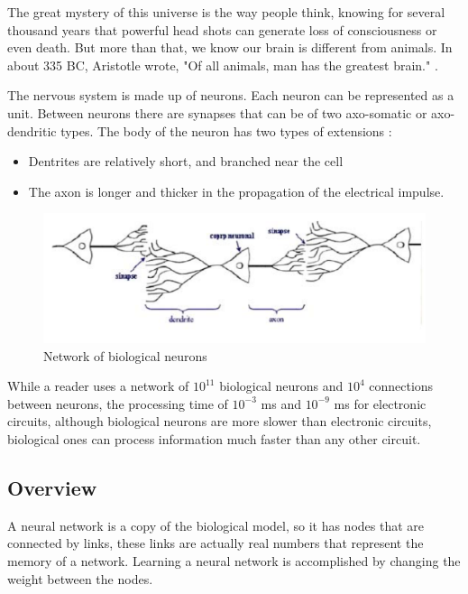 The great mystery of this universe is the way people think, knowing for several 
thousand years that powerful head shots can generate loss of consciousness or even death.
But more than that, we know our brain is different from animals. 
In about 335 BC, Aristotle wrote, "Of all animals, man has the greatest brain." \cite{book.neuronal.network.1995}.

The nervous system is made up of neurons. Each neuron can be represented as a unit.
Between neurons there are synapses that can be of two axo-somatic or axo-dendritic types. 
The body of the neuron has two types of extensions \cite{book.anatomie.1985}:
\begin{itemize}
\item Dentrites are relatively short, and branched near the cell
\item The axon is longer and thicker in the propagation of the electrical impulse.
\end{itemize}

\begin{figure}[htbp]
	\centerline{\includegraphics[scale=0.75]{fig/neuron.png}}  
	\caption{Network of biological neurons \cite{book.neuronal.network.1995}}
\end{figure}

While a reader uses a network of  $10^{11}$ biological neurons and $10^{4}$ connections between neurons, 
the processing time of $10^{-3}$ ms and $10^{-9}$ ms for electronic circuits, 
although biological neurons are more slower than electronic circuits, biological ones can process information much faster than any other circuit. \cite{book.anatomie.1985}

\subsection{Overview}

A neural network is a copy of the biological model, so it has nodes that are connected by links,
these links are actually real numbers that represent the memory of a network. 
Learning a neural network is accomplished by changing the weight between the nodes.

